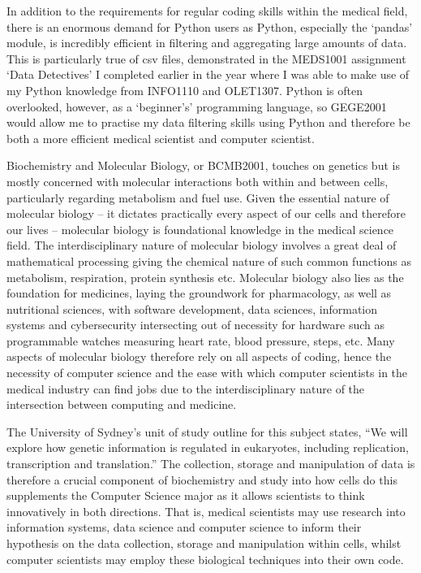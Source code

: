 In addition to the requirements for regular coding skills within the medical field, there is an enormous demand for Python users as Python, especially the ‘pandas’ module, is incredibly efficient in filtering and aggregating large amounts of data. This is particularly true of csv files, demonstrated in the MEDS1001 assignment ‘Data Detectives’ I completed earlier in the year where I was able to make use of my Python knowledge from INFO1110 and OLET1307. Python is often overlooked, however, as a ‘beginner’s’ programming language, so GEGE2001 would allow me to practise my data filtering skills using Python and therefore be both a more efficient medical scientist and computer scientist.


Biochemistry and Molecular Biology, or BCMB2001, touches on genetics but is mostly concerned with molecular interactions both within and between cells, particularly regarding metabolism and fuel use. Given the essential nature of molecular biology – it dictates practically every aspect of our cells and therefore our lives – molecular biology is foundational knowledge in the medical science field. The interdisciplinary nature of molecular biology involves a great deal of mathematical processing giving the chemical nature of such common functions as metabolism, respiration, protein synthesis etc. Molecular biology also lies as the foundation for medicines, laying the groundwork for pharmacology, as well as nutritional sciences, with software development, data sciences, information systems and cybersecurity intersecting out of necessity for hardware such as programmable watches measuring heart rate, blood pressure, steps, etc. Many aspects of molecular biology therefore rely on all aspects of coding, hence the necessity of computer science and the ease with which computer scientists in the medical industry can find jobs due to the interdisciplinary nature of the intersection between computing and medicine.


The University of Sydney’s unit of study outline for this subject states, “We will explore how genetic information is regulated in eukaryotes, including replication, transcription and translation.” The collection, storage and manipulation of data is therefore a crucial component of biochemistry and study into how cells do this supplements the Computer Science major as it allows scientists to think innovatively in both directions. That is, medical scientists may use research into information systems, data science and computer science to inform their hypothesis on the data collection, storage and manipulation within cells, whilst computer scientists may employ these biological techniques into their own code.


